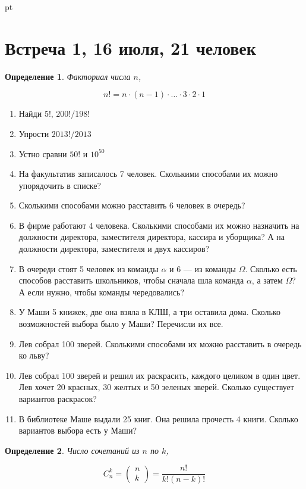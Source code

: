 \documentclass[pdftex,12pt,a4paper]{article}
\newtheorem*{defin}{Определение}
\begin{document}
 pt %



\section{Встреча 1, 16 июля, 21 человек}


\begin{defin}
Факториал числа $n$,

\begin{equation}
n! = n\cdot (n-1)\cdot \ldots \cdot 3\cdot 2\cdot 1
\end{equation}
\end{defin}


\begin{enumerate}
\item Найди $5!$, $200!/198!$
\item Упрости $2013!/2013$
\item Устно сравни $50!$ и $10^{50}$
\item На факультатив записалось 7 человек. Сколькими способами их можно упорядочить в списке?
\item Сколькими способами можно расставить 6 человек в очередь?
\item В фирме работают 4 человека. Сколькими способами их можно назначить на должности директора, заместителя директора, кассира и уборщика? А на должности директора, заместителя и двух кассиров?
\item В очереди стоят 5 человек из команды $\alpha$ и 6 --- из команды $\Omega$. Сколько есть способов расставить школьников, чтобы сначала шла команда $\alpha$, а затем $\Omega$? А если нужно, чтобы команды чередовались? 
\item У Маши 5 книжек, две она взяла в КЛШ, а три оставила дома. Сколько возможностей выбора было у Маши? Перечисли их все.
\item Лев собрал 100 зверей. Сколькими способами их можно расставить в очередь ко льву?
\item Лев собрал 100 зверей и решил их раскрасить, каждого целиком в один цвет. Лев хочет 20 красных, 30 желтых и 50 зеленых зверей. Сколько существует вариантов раскрасок?
\item В библиотеке Маше выдали 25 книг. Она решила прочесть 4 книги. Сколько вариантов выбора есть у Маши?
\end{enumerate}

\begin{defin}
Число сочетаний из $n$ по $k$, 

\begin{equation}
C_n^k=\left( \begin{array}{c}
n \\ 
k
\end{array}  \right) = \frac{n!}{k!(n-k)!}
\end{equation}

\end{defin}
\end{document}

